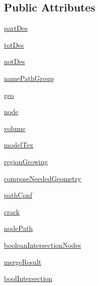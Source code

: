 \subsection*{Public Attributes}
\begin{DoxyCompactItemize}
\item 
\hyperlink{classdestruction_1_1_des_pattern_control_1_1_des_pattern_control_a25fc98fbfe2084e3b0c4c7835c95df81}{part\-Des}
\item 
\hyperlink{classdestruction_1_1_des_pattern_control_1_1_des_pattern_control_af74b74a8ecbdb52aabdd4f6c821bf178}{tot\-Des}
\item 
\hyperlink{classdestruction_1_1_des_pattern_control_1_1_des_pattern_control_a3a38efe3cde4950cea0621aa62099536}{not\-Des}
\item 
\hyperlink{classdestruction_1_1_des_pattern_control_1_1_des_pattern_control_a6e725346867c1f5f85a930dfbad8161c}{name\-Path\-Group}
\item 
\hyperlink{classdestruction_1_1_des_pattern_control_1_1_des_pattern_control_a87132cbf4f584090d2481e192eb6b12b}{geo}
\item 
\hyperlink{classdestruction_1_1_des_pattern_control_1_1_des_pattern_control_a092e9ba11b744b7edbba5418f3c230a9}{node}
\item 
\hyperlink{classdestruction_1_1_des_pattern_control_1_1_des_pattern_control_af9413103dba48d398eb60c0eebf1f411}{volume}
\item 
\hyperlink{classdestruction_1_1_des_pattern_control_1_1_des_pattern_control_ab2f784f4149f303b629abfcaf6d4a4bc}{model\-Tex}
\item 
\hyperlink{classdestruction_1_1_des_pattern_control_1_1_des_pattern_control_a176b90fcb8d97ea1833937ff64e0bff7}{region\-Growing}
\item 
\hyperlink{classdestruction_1_1_des_pattern_control_1_1_des_pattern_control_acd17bd90447cfa9c4f462951a7cf1e1f}{compose\-Needed\-Geometry}
\item 
\hyperlink{classdestruction_1_1_des_pattern_control_1_1_des_pattern_control_ae369910438009b1f535ee331b97dd27c}{path\-Conf}
\item 
\hyperlink{classdestruction_1_1_des_pattern_control_1_1_des_pattern_control_ae1756d8c82f999bf59e87cdc48929d25}{crack}
\item 
\hyperlink{classdestruction_1_1_des_pattern_control_1_1_des_pattern_control_aeec62b8b7060b6c5a1ddeea9edd3c98d}{node\-Path}
\item 
\hyperlink{classdestruction_1_1_des_pattern_control_1_1_des_pattern_control_a840b54d2e102ff680ae6b8ad632357a7}{boolean\-Intersection\-Nodes}
\item 
\hyperlink{classdestruction_1_1_des_pattern_control_1_1_des_pattern_control_aea1b0ac215b2a0057e78dec03efc5217}{merge\-Result}
\item 
\hyperlink{classdestruction_1_1_des_pattern_control_1_1_des_pattern_control_ac6ef3d7f95b9383fa849bae43126dca9}{bool\-Intersection}
\end{DoxyCompactItemize}


